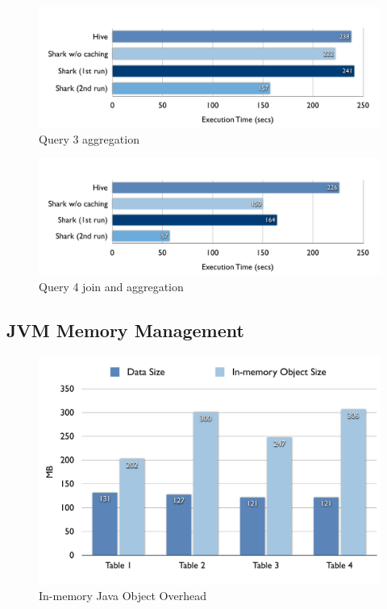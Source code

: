 \begin{figure}
	\centering
	\includegraphics[width=\linewidth]{files/query3.pdf}
	\caption{Query 3 aggregation}
	\label{fig:query3}
\end{figure}

\begin{figure}
	\centering
	\includegraphics[width=\linewidth]{files/query4.pdf}
	\caption{Query 4 join and aggregation}
	\label{fig:query4}
\end{figure}


\subsection{JVM Memory Management}

\begin{figure}
	\centering
	\includegraphics[width=\linewidth]{files/object-overhead.pdf}
	\caption{In-memory Java Object Overhead}
\end{figure}

